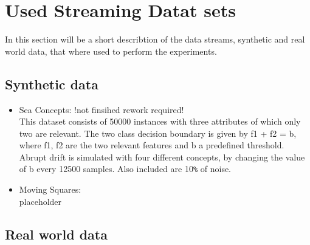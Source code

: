 \documentclass[12pt,oneside,a4paper,parskip]{scrbook}
\begin{document}
\section{Used Streaming Datat sets}

In this section will be a short describtion of the data streams, synthetic and real world data, that where used to 
perform the experiments.

\subsection{Synthetic data}

\begin{itemize}
  \item Sea Concepts: !not finsihed rework required!\\
        This dataset consists of 50000 instances with three attributes of which only two are relevant. 
        The two class decision boundary is given by f1 + f2 = b, where f1, f2 are the two relevant features and b a
        predefined threshold. Abrupt drift is simulated with four different concepts, by changing the value of b every 
        12500 samples. Also included are 10\verb|%| of noise. \cite{SEADataset}
  \item Moving Squares: \\
        placeholder
\end{itemize}

\subsection{Real world data}
\end{document}

